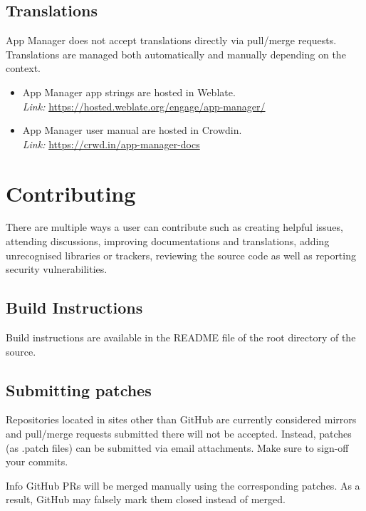 \subsection{Translations}\label{subsec:translations}
App Manager does not accept translations directly via pull/merge requests. Translations are managed both automatically
and manually depending on the context.
\begin{itemize}
    \item App Manager app strings are hosted in Weblate.\\
    \textit{Link:} \url{https://hosted.weblate.org/engage/app-manager/}
    \item App Manager user manual are hosted in Crowdin.\\
    \textit{Link:} \url{https://crwd.in/app-manager-docs}
\end{itemize}

\section{Contributing}\label{sec:contributing}
There are multiple ways a user can contribute such as creating helpful issues, attending discussions, improving
documentations and translations, adding unrecognised libraries or trackers, reviewing the source code as well as
reporting security vulnerabilities.

\subsection{Build Instructions}\label{sec:build-instructions}
Build instructions are available in the README file of the root directory of the source.

\subsection{Submitting patches}\label{subsec:submitting-patches}
Repositories located in sites other than GitHub are currently considered mirrors and pull/merge requests submitted there
will not be accepted. Instead, patches (as .patch files) can be submitted via email attachments. Make sure to sign-off
your commits.

\begin{tip}{Info}
    GitHub PRs will be merged manually using the corresponding patches. As a result, GitHub may falsely mark them closed
    instead of merged.
\end{tip}

